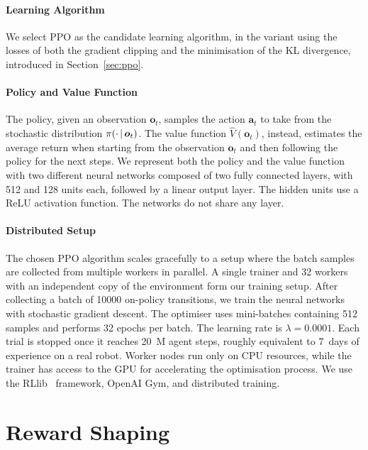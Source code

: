 \paragraph{Learning Algorithm}

We select \ac{PPO} as the candidate learning algorithm, in the variant using the losses of both the gradient clipping and the minimisation of the \ac{KL} divergence, introduced in Section~\ref{sec:ppo}.

\paragraph{Policy and Value Function}

The policy, given an observation $\boldsymbol{o}_t$, samples the action $\boldsymbol{a}_t$ to take from the stochastic distribution $\pi(\cdot \operatorname{\mid} \boldsymbol{o}_t)$.
The value function $\hat{V}(\boldsymbol{o}_t)$, instead, estimates the average return when starting from the observation $\boldsymbol{o}_t$ and then following the policy for the next steps.
We represent both the policy and the value function with two different neural networks composed of two fully connected layers, with 512 and 128 units each, followed by a linear output layer.
The hidden units use a ReLU activation function.
The networks do not share any layer.

\paragraph{Distributed Setup}

The chosen \ac{PPO} algorithm scales gracefully to a setup where the batch samples are collected from multiple workers in parallel.
A single trainer and 32 workers with an independent copy of the environment form our training setup.
After collecting a batch of 10000 on-policy transitions, we train the neural networks with stochastic gradient descent.
The optimiser uses mini-batches containing 512 samples and performs 32 epochs per batch.
The learning rate is $\lambda = 0.0001$.
Each trial is stopped once it reaches 20~M agent steps, roughly equivalent to 7~days of experience on a real robot.
Worker nodes run only on \ac{CPU} resources, while the trainer has access to the \ac{GPU} for accelerating the optimisation process.
We use the RLlib~\parencite{liang_rllib_2018} framework, OpenAI Gym, and distributed training.

\section{Reward Shaping}

